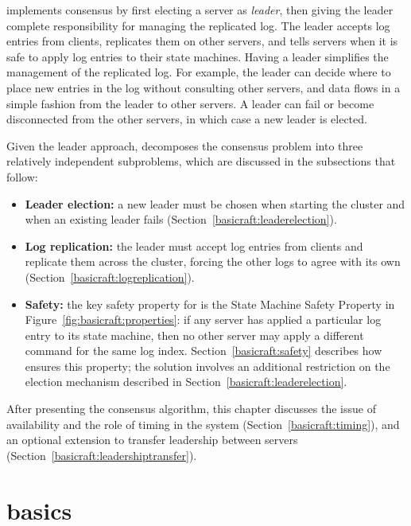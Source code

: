 \name{} implements consensus by first electing a server as
\emph{leader}, then giving
the leader complete responsibility for managing the replicated log. The leader
accepts log entries from clients, replicates them on other servers, and
tells servers when it is safe to apply log entries to their state machines.
Having a leader simplifies the management of the replicated log. For
example, the leader can decide where to place new entries in the log without
consulting other servers, and data flows in a simple fashion from
the leader to other servers.
A leader can fail or become disconnected from the other servers, in which
case a new leader is elected.

Given the leader approach, \name{} decomposes the consensus problem
into three relatively independent subproblems, which are discussed
in the subsections that follow:
\begin{itemize}
    \item \textbf{Leader election:} a new leader must be chosen
    when starting the cluster and when
    an existing leader fails (Section~\ref{basicraft:leaderelection}).
    \item \textbf{Log replication:} the leader must accept log entries
    from clients and replicate them across the cluster,
    forcing the other logs to agree with its own
    (Section~\ref{basicraft:logreplication}).
    \item \textbf{Safety:} the key safety property for \name{} is the
    State Machine Safety Property in Figure~\ref{fig:basicraft:properties}: if any
    server has applied a particular log entry to its state machine,
    then no other server may apply a different command for the
    same log index. Section~\ref{basicraft:safety} describes
    how \name{} ensures this property; the solution involves
    an additional restriction on the election mechanism described
    in Section~\ref{basicraft:leaderelection}.
\end{itemize}
After presenting the consensus algorithm, this chapter discusses the
issue of availability and the role of timing in the system
(Section~\ref{basicraft:timing}), and an optional extension to transfer
leadership between servers (Section~\ref{basicraft:leadershiptransfer}).

\section{\name{} basics}
\label{basicraft:basics}

